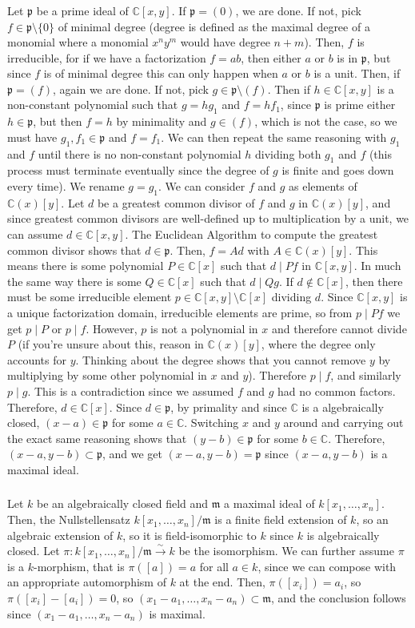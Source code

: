 \documentclass{article}
\newcommand{\C}{\mathbb{C}}
\newcommand{\m}{\mathfrak{m}}
\newcommand{\p}{\mathfrak{p}}
\newcommand{\exercise}{\subsubsection} %
\begin{document}
\exercise{} Let $\p$ be a prime ideal of $\C[x,y]$. If $\p = (0)$, we are done. If not, pick $f \in \p \setminus \{0\}$ of minimal degree (degree is defined as the maximal degree of a monomial where a monomial $x^n y^m$ would have degree $n+m$). Then, $f$ is irreducible, for if we have a factorization $f = ab$, then either $a$ or $b$ is in $\p$, but since $f$ is of minimal degree this can only happen when $a$ or $b$ is a unit. Then, if $\p = (f)$, again we are done. If not, pick $g \in \p\setminus (f)$. Then if $h \in \C[x,y]$ is a non-constant polynomial such that $g = hg_1$ and $f = hf_1$, since $\p$ is prime either $h \in \p$, but then $f = h$ by minimality and $g \in (f)$, which is not the case, so we must have $g_1, f_1 \in \p$ and $f = f_1$. We can then repeat the same reasoning with $g_1$ and $f$ until there is no non-constant polynomial $h$ dividing both $g_1$ and $f$ (this process must terminate eventually since the degree of $g$ is finite and goes down every time). We rename $g = g_1$. We can consider $f$ and $g$ as elements of $\C(x)[y]$. Let $d$ be a greatest common divisor of $f$ and $g$ in $\C(x)[y]$, and since greatest common divisors are well-defined up to multiplication by a unit, we can assume $d \in \C[x,y]$. The Euclidean Algorithm to compute the greatest common divisor shows that $d \in \p$. Then, $f = Ad$ with $A \in \C(x)[y]$. This means there is some polynomial $P \in \C[x]$ such that $d \mid Pf$ in $\C[x,y]$. In much the same way there is some $Q \in \C[x]$ such that $d \mid Qg$. If $d \notin \C[x]$, then there must be some irreducible element $p \in \C[x,y] \setminus \C[x]$ dividing $d$. Since $\C[x,y]$ is a unique factorization domain, irreducible elements are prime, so from $p \mid Pf$ we get $p \mid P$ or $p\mid f$. However, $p$ is not a polynomial in $x$ and therefore cannot divide $P$ (if you're unsure about this, reason in $\C(x)[y]$, where the degree only accounts for $y$. Thinking about the degree shows that you cannot remove $y$ by multiplying by some other polynomial in $x$ and $y$). Therefore $p \mid f$, and similarly $p \mid g$. This is a contradiction since we assumed $f$ and $g$ had no common factors. Therefore, $d \in \C[x]$. Since $d \in \p$, by primality and since $\C$ is a algebraically closed, $(x-a) \in \p$ for some $a \in \C$. Switching $x$ and $y$ around and carrying out the exact same reasoning shows that $(y-b) \in \p$ for some $b \in \C$. Therefore, $(x-a,y-b) \subset \p$, and we get $(x-a,y-b) = \p$ since $(x-a,y-b)$ is a maximal ideal.

\exercise{} Let $k$ be an algebraically closed field and $\m$ a maximal ideal of $k[x_1, \dots, x_n]$. Then, the Nullstellensatz $k[x_1,\dots,x_n]/\m$ is a finite field extension of $k$, so an algebraic extension of $k$, so it is field-isomorphic to $k$ since $k$ is algebraically closed. Let $\pi : k[x_1,\dots,x_n]/\m \xrightarrow{\sim} k$ be the isomorphism. We can further assume $\pi$ is a $k$-morphism, that is $\pi([a]) = a$ for all $a \in k$, since we can compose with an appropriate automorphism of $k$ at the end. Then, $\pi([x_i]) = a_i$, so $\pi([x_i] - [a_i]) = 0$, so $(x_1-a_1,\dots,x_n-a_n) \subset \m$, and the conclusion follows since $(x_1-a_1,\dots,x_n-a_n)$ is maximal.
\end{document}
